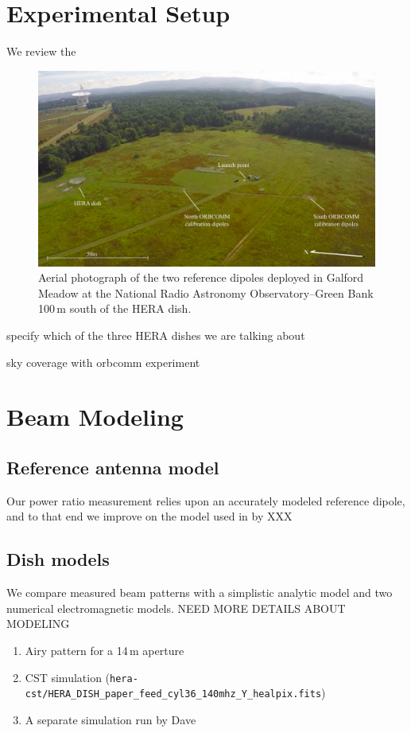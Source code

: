 \documentclass[preprint]{aastex}
\begin{document}
\section{Experimental Setup}

We review the 


\begin{figure}[h]
\includegraphics[width=6.5in]{aerial.png}
\caption{Aerial photograph of the two reference dipoles deployed in Galford Meadow at the National Radio Astronomy Observatory--Green Bank 100\,m south of the HERA dish.}
\label{fig:null3}
\end{figure}


specify which of the three HERA dishes we are talking about 

sky coverage with orbcomm experiment

\section{Beam Modeling}

\subsection{Reference antenna model}
Our power ratio measurement relies upon an accurately modeled reference dipole, and to that end we improve on the model used in \citep{neben15} by XXX

\subsection{Dish models}
\label{sec:dishmodels}

We compare measured beam patterns with a simplistic analytic model and two numerical electromagnetic models. NEED MORE DETAILS ABOUT MODELING
\begin{enumerate}
	\item Airy pattern for a 14\,m aperture
	\item CST simulation (\texttt{hera-cst/HERA\_DISH\_paper\_feed\_cyl36\_140mhz\_Y\_healpix.fits})
	\item A separate simulation run by Dave
\end{enumerate}
\end{document}
